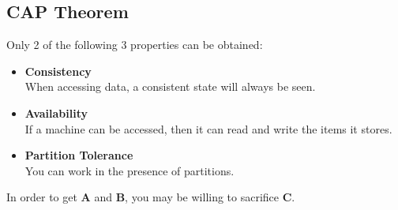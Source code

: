 \documentclass{article}
\begin{document}
\subsection{CAP Theorem}
Only 2 of the following 3 properties can be obtained:

\begin{itemize}
	\item \textbf{Consistency}
	\vspace{.2cm} \\
	When accessing data, a consistent state will always be seen.
	
	\item \textbf{Availability}
	\vspace{.2cm} \\
	If a machine can be accessed, then it can read and write the items it stores.
	
	\item \textbf{Partition Tolerance}
	\vspace{.2cm} \\
	You can work in the presence of partitions.
\end{itemize}
In order to get \textbf{A} and \textbf{B}, you may be willing to sacrifice \textbf{C}.
\end{document}
